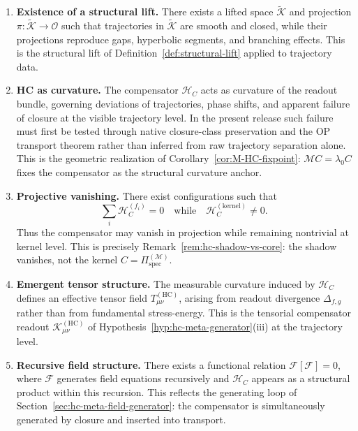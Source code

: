 \begin{theorem}
\begin{enumerate}[label=(\arabic*)]
  \item \textbf{Existence of a structural lift.}
  There exists a lifted space $\tilde{\mathcal{K}}$ and projection
  $\pi : \tilde{\mathcal{K}} \to \mathcal{O}$ such that trajectories
  in $\tilde{\mathcal{K}}$ are smooth and closed, while their
  projections reproduce gaps, hyperbolic segments, and branching
  effects. This is the structural lift of
  Definition~\ref{def:structural-lift} applied to trajectory data.

  \item \textbf{HC as curvature.}
  The compensator $\mathcal{H}_C$ acts as curvature of the readout
  bundle, governing deviations of trajectories, phase shifts, and
  apparent failure of closure at the visible trajectory level. In the
  present release such failure must first be tested through native
  closure-class preservation and the OP transport theorem rather than
  inferred from raw trajectory separation alone. This is the geometric
  realization of Corollary~\ref{cor:M-HC-fixpoint}: $\mathcal{M}C = \lambda_0 C$
  fixes the compensator as the structural curvature anchor.

  \item \textbf{Projective vanishing.}
  There exist configurations such that
  \[
    \sum_i \mathcal{H}_C^{(f_i)} = 0
    \quad\text{while}\quad
    \mathcal{H}_C^{(\mathrm{kernel})} \neq 0.
  \]
  Thus the compensator may vanish in projection while remaining
  nontrivial at kernel level. This is precisely
  Remark~\ref{rem:hc-shadow-vs-core}: the shadow vanishes, not
  the kernel $C = \Pi^{(\mathcal{M})}_{\mathrm{spec}}$.

  \item \textbf{Emergent tensor structure.}
  The measurable curvature induced by $\mathcal{H}_C$ defines an
  effective tensor field $T_{\mu\nu}^{(\mathrm{HC})}$, arising from
  readout divergence $\Delta_{f,g}$ rather than from fundamental
  stress-energy. This is the tensorial compensator readout
  $\mathcal{K}_{\mu\nu}^{(\mathrm{HC})}$ of
  Hypothesis~\ref{hyp:hc-meta-generator}(iii) at the trajectory level.

  \item \textbf{Recursive field structure.}
  There exists a functional relation
  $\mathcal{F}[\mathcal{F}] = 0$,
  where $\mathcal{F}$ generates field equations recursively and
  $\mathcal{H}_C$ appears as a structural product within this
  recursion. This reflects the generating loop of
  Section~\ref{sec:hc-meta-field-generator}: the compensator is
  simultaneously generated by closure and inserted into transport.
\end{enumerate}
\end{theorem}

